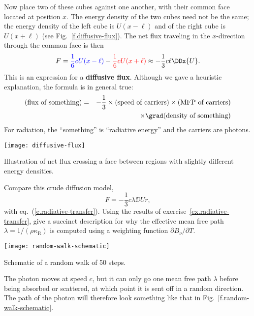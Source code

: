 Now place two of these cubes against one another, with their common face located at position $x$. The energy density of the two cubes need not be the same; the energy density of the left cube is $U(x-\ell)$ and of the right cube is $U(x+\ell)$ (see Fig.~\ref{f.diffusive-flux}). The net flux traveling in the $x$-direction through the common face is then
\[
	F = {\color{blue}\frac{1}{6} c U(x-\ell)} - {\color{red}\frac{1}{6} c U(x+\ell)} \approx -\frac{1}{3}c\ell \DDx{U}.
\]
This is an expression for a \textbf{diffusive flux}. Although we gave a heuristic explanation, the formula is in general true:
\begin{eqnarray}
\nonumber
(\textrm{flux of something}) &=& -\frac{1}{3}\times(\textrm{speed of carriers})\times(\textrm{MFP of carriers})\\
&&\times \grad(\textrm{density of something})
\label{e.diffusive-flux}
\end{eqnarray}
For radiation, the ``something'' is ``radiative energy'' and the carriers are photons.
\begin{marginfigure}[-12\baselineskip]
\texttt{[image: diffusive-flux]}
\caption{\label{f.diffusive-flux} Illustration of net flux crossing a face between regions with slightly different energy densities.}
\end{marginfigure}

\begin{exercisebox}
Compare this crude diffusion model,
\[
	F = -\frac{1}{3}c\lambda\DD{U}{r},
\]
with eq.~(\ref{e.radiative-transfer}). Using the results of exercise~\ref{ex.radiative-transfer}, give a succinct description for why the effective mean free path $\lambda = 1/(\rho\kappa_{\mathrm{R}})$ is computed using a weighting function $\partial B_{\nu}/\partial T$.
\end{exercisebox}

\begin{marginfigure}
\texttt{[image: random-walk-schematic]}
\caption{\label{f.random-walk-schematic}Schematic of a random walk of 50 steps.}
\end{marginfigure}
The photon moves at speed $c$, but it can only go one mean free path $\lambda$ before being absorbed or scattered, at which point it is sent off in a random direction. The path of the photon will therefore look something like that in Fig.~\ref{f.random-walk-schematic}.


